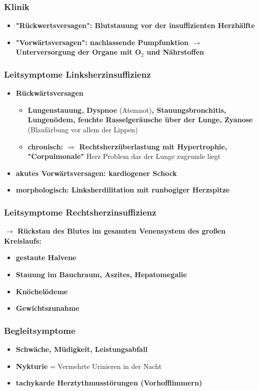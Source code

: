 		\subsubsection{Klinik}
			\begin{itemize}
				\item \textbf{"Rückwertsversagen": Blutstauung vor der insuffizienten Herzhälfte}
				\item \textbf{"Vorwärtsversagen": nachlassende Pumpfunktion $\rightarrow$ Unterversorgung der Organe mit O$_2$ und Nährstoffen}
			\end{itemize}
		\subsubsection{Leitsymptome Linksherzinsuffizienz}
			\begin{itemize}
				\item \textbf{Rückwärtsversagen}
					\begin{itemize}
						\item \textbf{Lungenstauung, Dyspnoe} (Atemnot)\textbf{, Stauungsbronchitis, Lungenödem, feuchte Rasselgeräusche über der Lunge, Zyanose} (Blaufärbung vor allem der Lippen)
						\item \textbf{chronisch: $\Rightarrow$ Rechtsherzüberlastung mit Hypertrophie, "Corpulmonale"} Herz Problem das der Lunge zugrunde liegt
					\end{itemize}
				\item \textbf{akutes Vorwärtsversagen: kardiogener Schock}
				\item \textbf{morphologisch: Linksherdilitation mit runbogiger Herzspitze}
			\end{itemize}
		\subsubsection{Leitsymptome Rechtsherzinsuffizienz}
			\textbf{$\rightarrow$ Rückstau des Blutes im gesamten Venensystem des großen Kreislaufs:}
			\begin{itemize}
				\item \textbf{gestaute Halvene}
				\item \textbf{Stauung im Bauchraum, Aszites, Hepatomegalie}
				\item \textbf{Knöchelödeme}
				\item \textbf{Gewichtszunahme}
			\end{itemize}
		\subsubsection{Begleitsymptome}
			\begin{itemize}
				\item \textbf{Schwäche, Müdigkeit, Leistungsabfall}
				\item \textbf{Nykturie} = Vermehrte Urinieren in der Nacht
				\item \textbf{tachykarde Herztythmusstörungen (Vorhofflimmern)}
			\end{itemize}
